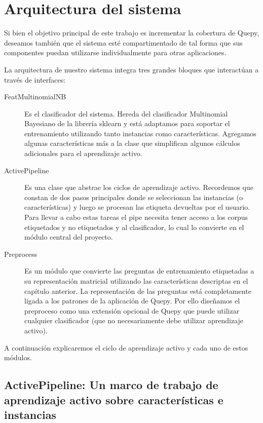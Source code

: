\chapter{Arquitectura del sistema}

Si bien el objetivo principal de este trabajo es incrementar la cobertura de Quepy, deseamos también que el sistema esté compartimentado de tal forma que sus componentes puedan utilizarse individualmente para otras aplicaciones.

La arquitectura de nuestro sistema integra tres grandes bloques que interactúan a través de interfaces:

\begin{description}
    \item[FeatMultinomialNB] Es el clasificador del sistema. Hereda del clasificador Multinomial Bayesiano de la librería sklearn y está adaptamos para soportar el entrenamiento utilizando tanto instancias como características. Agregamos algunas características más a la clase que simplifican algunos cálculos adicionales para el aprendizaje activo.
    \item[ActivePipeline] Es una clase que abstrae los ciclos de aprendizaje activo. Recordemos que constan de dos pasos principales donde se seleccionan las instancias (o características) y luego se procesan las etiqueta devueltas por el usuario. Para llevar a cabo estas tareas el pipe necesita tener acceso a los corpus etiquetados y no etiquetados y al clasificador, lo cual lo convierte en el módulo central del proyecto.
    \item[Preprocess] Es un módulo que convierte las preguntas de entrenamiento etiquetadas a su representación matricial utilizando las características descriptas en el capítulo anterior. La representación de las preguntas está completamente ligada a los patrones de la aplicación de Quepy. Por ello diseñamos el preproceso como una extensión opcional de Quepy que puede utilizar cualquier clasificador (que no necesariamente debe utilizar aprendizaje activo).
\end{description}

A continuación explicaremos el ciclo de aprendizaje activo y cada uno de estos módulos.

\section{ActivePipeline: Un marco de trabajo de aprendizaje activo sobre características e instancias}


